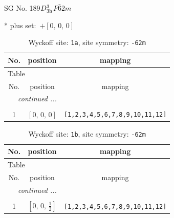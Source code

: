 \documentclass[fleqn,8pt]{jsarticle}
\begin{document}
\setcounter{MaxMatrixCols}{32}

\renewcommand{\tablename}{Table~}
\renewcommand{\figurename}{Figure~}
\begin{center}
\LARGE
SG No. 189\quad$D_{\rm 3h}^{3}$\quad$P\bar{6}2m$\quad[ hexagonal ]
\end{center}
* plus set:\,\,\,$+\left[ 0,\, 0,\, 0 \right]$
\renewcommand{\arraystretch}{1.2}
\begin{longtable}{ccc}
\caption{Wyckoff site: {\tt 1a}, site symmetry: {\tt -62m}}
 \\
 \hline \hline
No. & position & mapping \\ \hline \endfirsthead

\multicolumn{2}{l}{\tablename\ \thetable{}} \\
 \hline \hline
No. & position & mapping \\ \hline \endhead

 \hline \hline
\multicolumn{2}{r}{\footnotesize\it continued ...} \\ \endfoot

 \hline \hline
\multicolumn{2}{r}{} \\ \endlastfoot

1 & $\left[ 0,\, 0,\, 0 \right]$ & {\tt [1,2,3,4,5,6,7,8,9,10,11,12]} \\
\end{longtable}
\renewcommand{\arraystretch}{1.2}
\begin{longtable}{ccc}
\caption{Wyckoff site: {\tt 1b}, site symmetry: {\tt -62m}}
 \\
 \hline \hline
No. & position & mapping \\ \hline \endfirsthead

\multicolumn{2}{l}{\tablename\ \thetable{}} \\
 \hline \hline
No. & position & mapping \\ \hline \endhead

 \hline \hline
\multicolumn{2}{r}{\footnotesize\it continued ...} \\ \endfoot

 \hline \hline
\multicolumn{2}{r}{} \\ \endlastfoot

1 & $\left[ 0,\, 0,\, \frac{1}{2} \right]$ & {\tt [1,2,3,4,5,6,7,8,9,10,11,12]} \\
\end{longtable}
\renewcommand{\arraystretch}{1.2}
\end{document}
